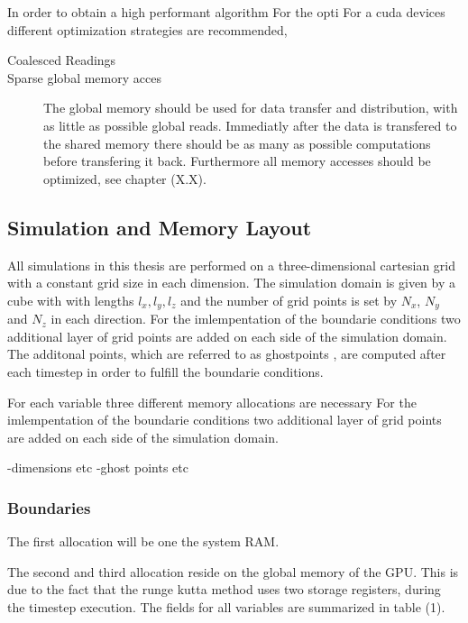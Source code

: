 In order to obtain a high performant algorithm
For the opti
For a cuda devices different optimization strategies are recommended,

\begin{description}
    \item[Coalesced Readings]
    \item[Sparse global memory acces]{
        The global memory should be used for data transfer and distribution, with as little as possible global reads.
        Immediatly after the data is transfered to the shared memory there should be as many as possible computations before transfering
        it back. Furthermore all memory accesses should be optimized, see chapter (X.X).}
    \end{description}


\subsection{Simulation and  Memory Layout}

All simulations in this thesis are performed on a three-dimensional cartesian grid
with a constant grid size  in each dimension.
The simulation domain is given by a cube with with lengths $l_x, l_y, l_z$
and the number of grid points is set by $N_x$, $N_y$ and $N_z$ in each direction.
For the imlempentation of the boundarie conditions  two additional layer of grid points
are added on each side of the simulation domain.
The additonal points, which are referred to as ghostpoints \citep{ctie},
are computed after each timestep in order to fulfill the boundarie conditions.

For each variable three different memory allocations are necessary
For the imlempentation of the boundarie conditions  two additional layer of grid points
are added on each side of the simulation domain.




-dimensions etc
-ghost points etc

\subsubsection{Boundaries}


\label{cuda:prepro}


The first allocation will be one the system RAM.

The second and third allocation reside on the global memory of the GPU.
This is due to the fact that the runge kutta method uses two storage registers, during the timestep execution.
The fields for all variables are summarized in table (1).

